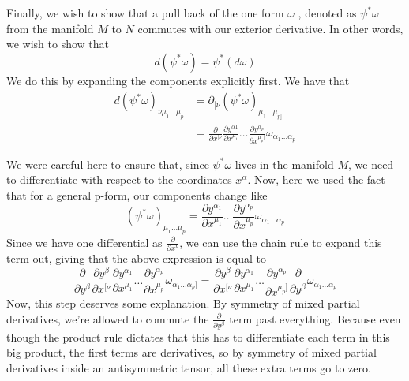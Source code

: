 Finally, we wish to show that a pull back of the 
one form $ \omega  $ , denoted as $\psi^* \omega $ from 
the manifold $ M $ to $ N $ commutes with our exterior derivative. 
In other words, we wish to show that 
\[
d ( \psi^* \omega  ) = \psi^ * ( d \omega)   
\] We do this by expanding the components explicitly  first. We have 
that 
\begin{align*}
d ( \psi ^* \omega  )_{ \nu \mu_1 \dots \mu_{ p } } &= \partial_{ [ \nu }( \psi^* \omega  )_{ \mu_1 \dots \mu_{ p ] }} \\
						    &= \frac{\partial  }{\partial x^{ [ \nu }} \frac{\partial y^{ \alpha 1 } }{\partial x^{ \mu_1 }} \dots \frac{\partial  y^{ \alpha_{ p }}}{\partial  x ^{ \mu_{ p } ] }} \omega _{ \alpha_1 \dots \alpha_{ p }}   
\end{align*}

We were careful here to ensure that, since $ \psi^* \omega  $ lives in 
the manifold $M $, we need to differentiate with respect to the coordinates 
$ x^{ \alpha }$. 
Now, here we used the fact that for a general p-form, our components 
change like
\[
( \psi^* \omega  )_{ \mu_1 \dots \mu_{p }} = \frac{\partial  y^{\alpha_1 } }{\partial x^{ \mu_1 }} \dots \frac{\partial y^{\alpha_{p } } }{\partial  x^{ \mu_{ p }}}  \omega _{ \alpha_1 \dots \alpha_{ p }} 
\] Since we have one differential as $ \frac{ \partial }{ \partial x^{ \nu  }}$,
we can use the chain rule to expand this term out, giving that 
the above expression is equal to 
\[
\frac{\partial  }{\partial  y ^{ \beta   }  } \frac{\partial  y^{ \beta  }  }{\partial x^{ [ \nu  }  }  \frac{\partial  y ^{ \alpha_1   }  }{\partial  x^{ \mu_1   }} \dots  \frac{\partial y^{ \alpha_{ p   } }}{\partial x^{ \mu_{ p } }  } \omega _{ \alpha_1 \dots \alpha_{ p } ]} = \frac{\partial y ^{ \beta   }}{\partial x^{ [ \nu  } } \frac{\partial  y^{ \alpha_1  }}{\partial x^{ \mu_1  } }  \dots \frac{\partial  y ^{ \alpha_{ p  }}}{\partial x^{ \mu_{ p   } ]  }} \frac{\partial }{\partial  y ^{ \beta   }  }  \omega _{ \alpha_1 \dots \alpha_{ p }}    
\] Now, this step deserves some 
explanation. By symmetry of mixed 
partial derivatives, 
we're allowed to commute the  $ \frac{\partial  }{\partial y^{ \beta  } } $ term past everything. Because even though the product rule dictates that this has to differentiate each term in this big product, the first terms are derivatives, so by symmetry of mixed partial derivatives inside an antisymmetric tensor, all these extra terms go to zero. 

